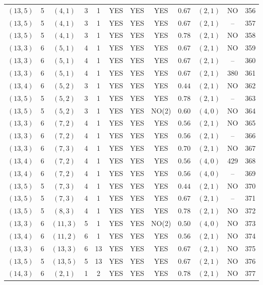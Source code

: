 \begin{longtable}{|c|c|c|c|c|c|c|c|c|c|c|c|}
$(13,5)$ & 5 & $(4,1)$ & 3 & 1 & YES & YES & YES & $0.67$ & $(2,1)$ & NO & 356\\
$(13,5)$ & 5 & $(4,1)$ & 3 & 1 & YES & YES & YES & $0.67$ & $(2,1)$ & -- & 357\\
$(13,5)$ & 5 & $(4,1)$ & 3 & 1 & YES & YES & YES & $0.78$ & $(2,1)$ & NO & 358\\
$(13,3)$ & 6 & $(5,1)$ & 4 & 1 & YES & YES & YES & $0.67$ & $(2,1)$ & NO & 359\\
$(13,3)$ & 6 & $(5,1)$ & 4 & 1 & YES & YES & YES & $0.67$ & $(2,1)$ & -- & 360\\
$(13,3)$ & 6 & $(5,1)$ & 4 & 1 & YES & YES & YES & $0.67$ & $(2,1)$ & 380 & 361\\
$(13,4)$ & 6 & $(5,2)$ & 3 & 1 & YES & YES & YES & $0.44$ & $(2,1)$ & NO & 362\\
$(13,5)$ & 5 & $(5,2)$ & 3 & 1 & YES & YES & YES & $0.78$ & $(2,1)$ & -- & 363\\
$(13,5)$ & 5 & $(5,2)$ & 3 & 1 & YES & YES & NO(2) & $0.60$ & $(4,0)$ & NO & 364\\
$(13,3)$ & 6 & $(7,2)$ & 4 & 1 & YES & YES & YES & $0.56$ & $(2,1)$ & NO & 365\\
$(13,3)$ & 6 & $(7,2)$ & 4 & 1 & YES & YES & YES & $0.56$ & $(2,1)$ & -- & 366\\
$(13,3)$ & 6 & $(7,3)$ & 4 & 1 & YES & YES & YES & $0.70$ & $(2,1)$ & NO & 367\\
$(13,4)$ & 6 & $(7,2)$ & 4 & 1 & YES & YES & YES & $0.56$ & $(4,0)$ & 429 & 368\\
$(13,4)$ & 6 & $(7,2)$ & 4 & 1 & YES & YES & YES & $0.56$ & $(4,0)$ & -- & 369\\
$(13,5)$ & 5 & $(7,3)$ & 4 & 1 & YES & YES & YES & $0.44$ & $(2,1)$ & NO & 370\\
$(13,5)$ & 5 & $(7,3)$ & 4 & 1 & YES & YES & YES & $0.67$ & $(2,1)$ & -- & 371\\
$(13,5)$ & 5 & $(8,3)$ & 4 & 1 & YES & YES & YES & $0.78$ & $(2,1)$ & NO & 372\\
$(13,3)$ & 6 & $(11,3)$ & 5 & 1 & YES & YES & NO(2) & $0.50$ & $(4,0)$ & NO & 373\\
$(13,4)$ & 6 & $(11,2)$ & 6 & 1 & YES & YES & YES & $0.56$ & $(2,1)$ & NO & 374\\
$(13,3)$ & 6 & $(13,3)$ & 6 & 13 & YES & YES & YES & $0.67$ & $(2,1)$ & NO & 375\\
$(13,5)$ & 5 & $(13,5)$ & 5 & 13 & YES & YES & YES & $0.67$ & $(2,1)$ & NO & 376\\
$(14,3)$ & 6 & $(2,1)$ & 1 & 2 & YES & YES & YES & $0.78$ & $(2,1)$ & NO & 377\\

\end{longtable}
